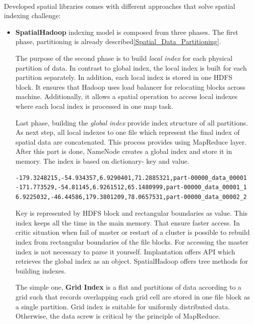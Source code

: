 \documentclass[a4paper,12pt,oneside]{report}
\begin{document}
	\paragraph{} Developed spatial libraries comes with different approaches that
	solve  spatial indexing challenge:
	\begin{itemize}
		\item \textbf{SpatialHadoop} indexing model is composed from three phases. The
		first phase, partitioning is already
		described\ref{Spatial_Data_Partitioning}.
		
		The purpose of the second phase is to build \textit{local index}  for each
		physical partition of data. 
		In contrast to global index, the local index is built for each partition
		separately. In addition, each local 
		index is stored in one HDFS block. It ensures that Hadoop uses load balancer for
		relocating blocks 
		across machine. Additionally, it allows  a spatial operation to access local
		indexes where each local 
		index is processed in one map task. 
		
		Last phase, building the \textit{global index} provide index structure of all
		partitions. As next step, 
		all local indexes to one file which represent the final index of spatial data
		are concatenated. This process 
		provides using MapReduce  layer. After this part is done, NameNode creates a
		global index
		and store it in memory. The index is based on dictionary- key and value.
		
		\begin{footnotesize}
			\begin{lstlisting}[style=mybash]
-179.3248215,-54.934357,6.9290401,71.2885321,part-00000_data_00001
-171.773529,-54.81145,6.9261512,65.1480999,part-00000_data_00001_1
6.9225032,-46.44586,179.3801209,78.0657531,part-00000_data_00002_2
			\end{lstlisting}\end{footnotesize}
		
		
		Key is represented by HDFS block and  rectangular boundaries as value. This
		index keeps all the 
		time in the main memory. That ensure faster access. In critic situation when
		fail of master or 
		restart of a cluster is possible to rebuild index from rectangular boundaries of
		the file blocks. 
		For accessing the master index is not necessary to parse it yourself.
		Implantation offers API 
		which retrieves the global index as an object.
		SpatialHadoop offers tree methods for building indexes. 
		
		The simple one, \textbf{Grid Index} is a flat and partitions of
		data according to a grid such that records overlapping each grid cell are stored
		in one file block 
		as a single partition. Grid index is suitable for uniformly distributed data.
		Otherwise, the data 
		screw is critical by the principle of MapReduce. 
		

\end{itemize}
\end{document}
